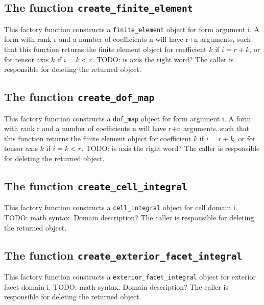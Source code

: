 \subsection{The function \texttt{create\_finite\_element}}
This factory function constructs a \texttt{finite\_element} object for form argument i.
A form with rank r and a number of coefficients n will have r+n arguments,
such that this function returns the finite element object for coefficient $k$ if $i=r+k$,
or for tensor axis $k$ if $i=k<r$. TODO: is axis the right word?
The caller is responsible for deleting the returned object.



\subsection{The function \texttt{create\_dof\_map}}
This factory function constructs a \texttt{dof\_map} object for form argument i.
A form with rank r and a number of coefficients n will have r+n arguments,
such that this function returns the finite element object for coefficient $k$ if $i=r+k$,
or for tensor axis $k$ if $i=k<r$. TODO: is axis the right word?
The caller is responsible for deleting the returned object.



\subsection{The function \texttt{create\_cell\_integral}}
This factory function constructs a \texttt{cell\_integral} object for cell domain i.
TODO: math syntax. Domain description?
The caller is responsible for deleting the returned object.



\subsection{The function \texttt{create\_exterior\_facet\_integral}}
This factory function constructs a \texttt{exterior\_facet\_integral} object for exterior facet domain i.
TODO: math syntax. Domain description?
The caller is responsible for deleting the returned object.



